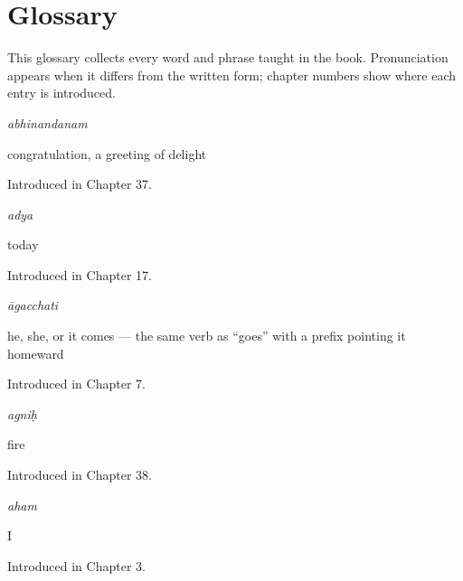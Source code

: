 
\chapter*{Glossary}

This glossary collects every word and phrase taught in the book. Pronunciation appears when it differs from the written form; chapter numbers show where each entry is introduced.

\noindent\begin{minipage}[t]{\linewidth}
\raggedright
\textbf{}\enspace\emph{abhinandanam}\par
\small congratulation, a greeting of delight\par
\footnotesize Introduced in Chapter 37.
\end{minipage}\par\medskip

\noindent\begin{minipage}[t]{\linewidth}
\raggedright
\textbf{}\enspace\emph{adya}\par
\small today\par
\footnotesize Introduced in Chapter 17.
\end{minipage}\par\medskip

\noindent\begin{minipage}[t]{\linewidth}
\raggedright
\textbf{}\enspace\emph{āgacchati}\par
\small he, she, or it comes — the same verb as \textquotedblleft{}goes\textquotedblright{} with a prefix pointing it homeward\par
\footnotesize Introduced in Chapter 7.
\end{minipage}\par\medskip

\noindent\begin{minipage}[t]{\linewidth}
\raggedright
\textbf{}\enspace\emph{agniḥ}\par
\small fire\par
\footnotesize Introduced in Chapter 38.
\end{minipage}\par\medskip

\noindent\begin{minipage}[t]{\linewidth}
\raggedright
\textbf{}\enspace\emph{aham}\par
\small I\par
\footnotesize Introduced in Chapter 3.
\end{minipage}\par\medskip

